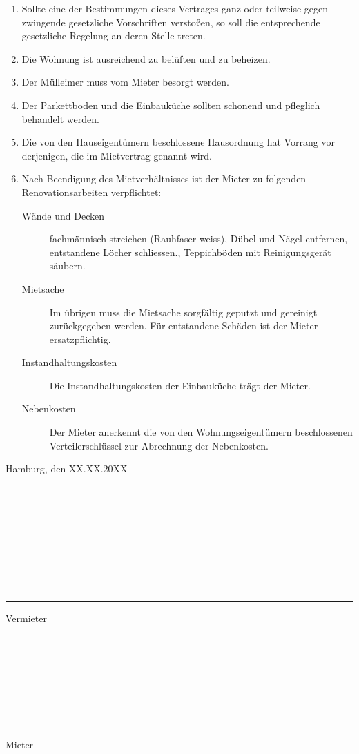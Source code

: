 \documentclass{scrreprt}[12pt,a4paper,twoside,duplex]
\newcommand{\vertragsschlussDatum}{\textcolor{zuBearbeiten}{XX.XX.20XX}}
\newcommand{\vertragsschlussOrt}{\textcolor{zuBearbeiten}{Hamburg}}
\begin{document}
\begin{contract}
\begin{enumerate}
  \item Sollte eine der Bestimmungen dieses Vertrages ganz oder teilweise gegen
  zwingende gesetzliche Vorschriften verstoßen, so soll die entsprechende
  gesetzliche Regelung an deren Stelle treten.
  \item Die Wohnung ist ausreichend zu belüften und zu beheizen.
  \item Der Mülleimer muss vom Mieter besorgt werden.
  \item Der Parkettboden und die Einbauküche sollten schonend und pfleglich
  behandelt werden.
  \item Die von den Hauseigentümern beschlossene Hausordnung hat Vorrang vor
  derjenigen, die im Mietvertrag genannt wird.
  \item Nach Beendigung des Mietverhältnisses ist der Mieter zu folgenden
  Renovationsarbeiten verpflichtet:
  \begin{description}
    \item[Wände und Decken] fachmännisch streichen (Rauhfaser weiss), Dübel und
    Nägel entfernen, entstandene Löcher schliessen., Teppichböden mit
    Reinigungsgerät säubern.
    \item[Mietsache] Im übrigen muss die Mietsache sorgfältig geputzt und
    gereinigt zu\-rück\-ge\-ge\-ben werden. Für entstandene Schäden ist der
    Mieter ersatzpflichtig.
    \item[Instandhaltungskosten] Die Instandhaltungskosten der Einbauküche
    trägt der Mieter.
    \item[Nebenkosten] Der Mieter anerkennt die von den Wohnungseigentümern
    beschlossenen Verteilerschlüssel zur Abrechnung der Nebenkosten.
  \end{description}


\end{enumerate}
\end{contract}

\vertragsschlussOrt, den \vertragsschlussDatum

    \

    \

    \

    \

    \



    \hrule\vspace{1ex} Vermieter

    \

    \

    \

    \

    \hrule\vspace{1ex} Mieter


    
\end{document}
